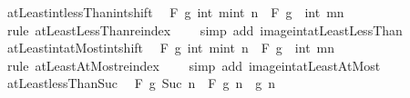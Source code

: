 \begin{isabellebody}
\endisatagproof
{\isafoldproof}%
%
\isadelimproof
\isanewline
%
\endisadelimproof
\isanewline
{}\isamarkupfalse%
\ atLeast{\isacharunderscore}{\kern0pt}int{\isacharunderscore}{\kern0pt}lessThan{\isacharunderscore}{\kern0pt}int{\isacharunderscore}{\kern0pt}shift{\isacharcolon}{\kern0pt}\isanewline
\ \ {\isachardoublequoteopen}F\ g\ {\isacharbraceleft}{\kern0pt}int\ m{\isachardot}{\kern0pt}{\isachardot}{\kern0pt}{\isacharless}{\kern0pt}int\ n{\isacharbraceright}{\kern0pt}\ {\isacharequal}{\kern0pt}\ F\ {\isacharparenleft}{\kern0pt}g\ {\isasymcirc}\ int{\isacharparenright}{\kern0pt}\ {\isacharbraceleft}{\kern0pt}m{\isachardot}{\kern0pt}{\isachardot}{\kern0pt}{\isacharless}{\kern0pt}n{\isacharbraceright}{\kern0pt}{\isachardoublequoteclose}\isanewline
%
\isadelimproof
\ \ %
\endisadelimproof
%
\isatagproof
{}\isamarkupfalse%
\ {\isacharparenleft}{\kern0pt}rule\ atLeastLessThan{\isacharunderscore}{\kern0pt}reindex{\isacharparenright}{\kern0pt}\isanewline
\ \ \ \ {\isacharparenleft}{\kern0pt}simp\ add{\isacharcolon}{\kern0pt}\ image{\isacharunderscore}{\kern0pt}int{\isacharunderscore}{\kern0pt}atLeastLessThan{\isacharparenright}{\kern0pt}%
\endisatagproof
{\isafoldproof}%
%
\isadelimproof
\isanewline
%
\endisadelimproof
\isanewline
{}\isamarkupfalse%
\ atLeast{\isacharunderscore}{\kern0pt}int{\isacharunderscore}{\kern0pt}atMost{\isacharunderscore}{\kern0pt}int{\isacharunderscore}{\kern0pt}shift{\isacharcolon}{\kern0pt}\isanewline
\ \ {\isachardoublequoteopen}F\ g\ {\isacharbraceleft}{\kern0pt}int\ m{\isachardot}{\kern0pt}{\isachardot}{\kern0pt}int\ n{\isacharbraceright}{\kern0pt}\ {\isacharequal}{\kern0pt}\ F\ {\isacharparenleft}{\kern0pt}g\ {\isasymcirc}\ int{\isacharparenright}{\kern0pt}\ {\isacharbraceleft}{\kern0pt}m{\isachardot}{\kern0pt}{\isachardot}{\kern0pt}n{\isacharbraceright}{\kern0pt}{\isachardoublequoteclose}\isanewline
%
\isadelimproof
\ \ %
\endisadelimproof
%
\isatagproof
{}\isamarkupfalse%
\ {\isacharparenleft}{\kern0pt}rule\ atLeastAtMost{\isacharunderscore}{\kern0pt}reindex{\isacharparenright}{\kern0pt}\isanewline
\ \ \ \ {\isacharparenleft}{\kern0pt}simp\ add{\isacharcolon}{\kern0pt}\ image{\isacharunderscore}{\kern0pt}int{\isacharunderscore}{\kern0pt}atLeastAtMost{\isacharparenright}{\kern0pt}%
\endisatagproof
{\isafoldproof}%
%
\isadelimproof
\isanewline
%
\endisadelimproof
\isanewline
{}\isamarkupfalse%
\ atLeast{}{\isacharunderscore}{\kern0pt}lessThan{\isacharunderscore}{\kern0pt}Suc{\isacharcolon}{\kern0pt}\isanewline
\ \ {\isachardoublequoteopen}F\ g\ {\isacharbraceleft}{\kern0pt}{}{\isachardot}{\kern0pt}{\isachardot}{\kern0pt}{\isacharless}{\kern0pt}Suc\ n{\isacharbraceright}{\kern0pt}\ {\isacharequal}{\kern0pt}\ F\ g\ {\isacharbraceleft}{\kern0pt}{}{\isachardot}{\kern0pt}{\isachardot}{\kern0pt}{\isacharless}{\kern0pt}n{\isacharbraceright}{\kern0pt}\ \isactrlbold {\isacharasterisk}{\kern0pt}\ g\ n{\isachardoublequoteclose}\isanewline

\end{isabellebody}

